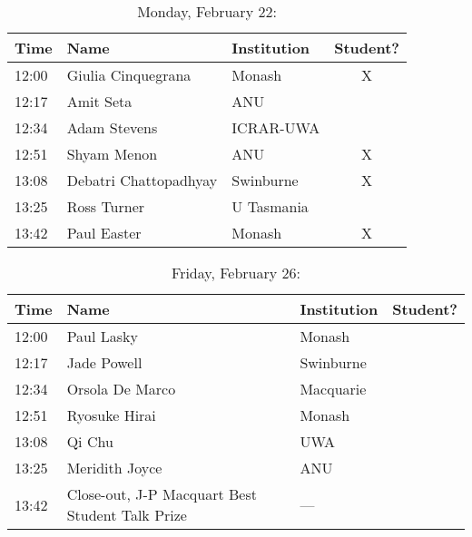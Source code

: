 \documentclass[amsmath,onecolumn]{revtex4-1}
\begin{document}
\begin{table}[!htbp]
	\centering
	\caption{Monday, February 22:}
\begin{tabular}{| l | l | l | c |}
	\hline
	Time & Name  & Institution & Student? \\ 		
	\hline
	12:00 & Giulia	Cinquegrana & Monash & X\\
	12:17 & Amit 	Seta & ANU  & \\
	12:34 & Adam	Stevens & ICRAR-UWA &\\
	12:51 & Shyam	Menon & ANU & X\\
	13:08 & Debatri 	Chattopadhyay & Swinburne  & X \\
	13:25 & Ross	Turner  & U Tasmania  & \\
	13:42 & Paul	Easter & Monash & X\\
	\hline
\end{tabular}
\end{table}

\begin{table}[!htbp]
	\centering
	\caption{Friday, February 26:}
\begin{tabular}{| l | l | l | c |}
	\hline
	Time & Name  & Institution & Student? \\ 		
	\hline
	12:00 & Paul	Lasky & Monash & \\
	12:17 & Jade	Powell & Swinburne & \\
	12:34 & Orsola	De Marco & Macquarie & \\
	12:51 & Ryosuke	Hirai  & Monash & \\
	13:08 & Qi	Chu & UWA & \\
	13:25 & Meridith	Joyce & ANU  & \\
	13:42 & Close-out, J-P Macquart Best Student Talk Prize & --- & \\
	\hline
\end{tabular}
\end{table}
\end{document}
